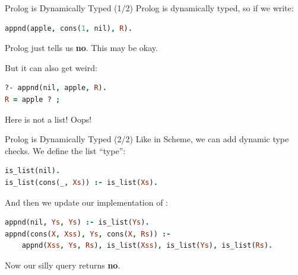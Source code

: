 \begin{frame}[fragile]{Prolog is Dynamically Typed (1/2)}
Prolog is dynamically typed, so if we write:

\begin{lstlisting}[language=prolog, xleftmargin=0.5cm]
appnd(apple, cons(1, nil), R).
\end{lstlisting}

Prolog just tells us \textbf{no}. This may be okay.

\pause

But it can also get weird:

\begin{lstlisting}[language=prolog, xleftmargin=0.5cm]
?- appnd(nil, apple, R).
R = apple ? ;
\end{lstlisting}

Here  is not a list! Oops!
\end{frame}
    
\begin{frame}[fragile]{Prolog is Dynamically Typed (2/2)}
Like in Scheme, we can add dynamic type checks. We define the list ``type'':

\begin{lstlisting}[language=prolog, xleftmargin=0.5cm]
is_list(nil).
is_list(cons(_, Xs)) :- is_list(Xs).
\end{lstlisting}

\pause

And then we update our implementation of :

\begin{lstlisting}[language=prolog, xleftmargin=0.5cm]
appnd(nil, Ys, Ys) :- is_list(Ys).
appnd(cons(X, Xss), Ys, cons(X, Rs)) :- 
    appnd(Xss, Ys, Rs), is_list(Xss), is_list(Ys), is_list(Rs).
\end{lstlisting}

Now our silly query  returns \textbf{no}.
\end{frame}

